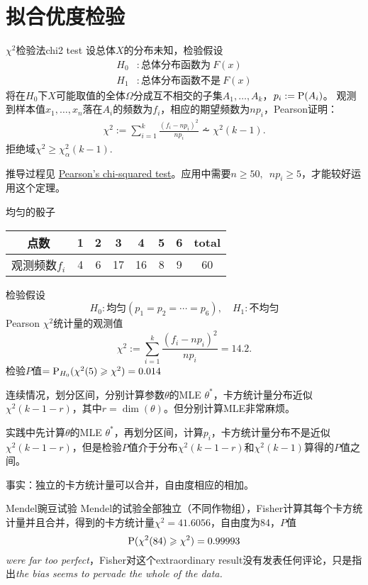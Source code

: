 \section{拟合优度检验}
\begin{theorem}{$\chi^2$检验法}{chi2 test}
	设总体$X$的分布未知，检验假设
	\begin{align*}
		H_0&:\text{总体分布函数为}~F(x)\\
		H_1&:\text{总体分布函数不是}~F(x)
	\end{align*}
	将在$H_0$下$X$可能取值的全体$\Omega$分成互不相交的子集$A_1,\ldots,A_k$，$p_i:=\P(A_i)$。
	观测到样本值$x_1,\ldots,x_n$落在$A_i$的频数为$f_i$，相应的期望频数为$np_i$，Pearson证明：
	\begin{align}
		\chi^2:=\sum_{i=1}^k\frac{(f_i-np_i)^2}{np_i}\dotsim\chi^2(k-1).
	\end{align}
	拒绝域$\chi^2\geqslant\chi^2_\alpha(k-1).$
\end{theorem}
推导过程见 \href{https://en.wikipedia.org/wiki/Pearson%27s_chi-squared_test}{Pearson's chi-squared test}。应用中需要$n\geqslant 50,\enspace np_i\geqslant 5$，才能较好运用这个定理。
\begin{example}{均匀的骰子}{}
	\begin{center}
		\begin{tabular}{cccccccc}
			\toprule
			点数&1&2&3&4&5&6&total\\
			\midrule
			观测频数$f_i$&4&6&17&16&8&9&60\\
			\bottomrule
		\end{tabular}
	\end{center}
	检验假设
	\[
		H_0:\text{均匀}(p_1=p_2=\cdots=p_6),\quad H_1:\text{不均匀}
	\]
	Pearson $\chi^2$统计量的观测值
	\[
		\chi^2:=\sum_{i=1}^k\frac{(f_i-np_i)^2}{np_i}=14.2.
	\]
	检验$P$值$=\P_{H_0}(\chi^2(5)\geqslant\chi^2)=0.014$
\end{example}
连续情况，划分区间，分别计算参数$\theta$的MLE $\theta^\ast$，卡方统计量分布近似$\chi^2(k-1-r)$，其中$r=\dim(\theta)$。但分别计算MLE非常麻烦。

实践中先计算$\theta$的MLE $\theta^\ast$，再划分区间，计算$p_i$，卡方统计量分布不是近似$\chi^2(k-1-r)$，但是检验$P$值介于分布$\chi^2(k-1-r)$和$\chi^2(k-1)$算得的$P$值之间。

事实：独立的卡方统计量可以合并，自由度相应的相加。
\begin{example}{Mendel豌豆试验}{}
	Mendel的试验全部独立（不同作物组），Fisher计算其每个卡方统计量并且合并，得到的卡方统计量$\chi^2=41.6056$，自由度为84，$P$值
	\[
		\P(\chi^2(84)\geqslant\chi^2)=0.99993
	\]
	\textit{were far too perfect}，Fisher对这个extraordinary result没有发表任何评论，只是指出\textit{the bias seems to pervade the whole of the data.}
\end{example}
